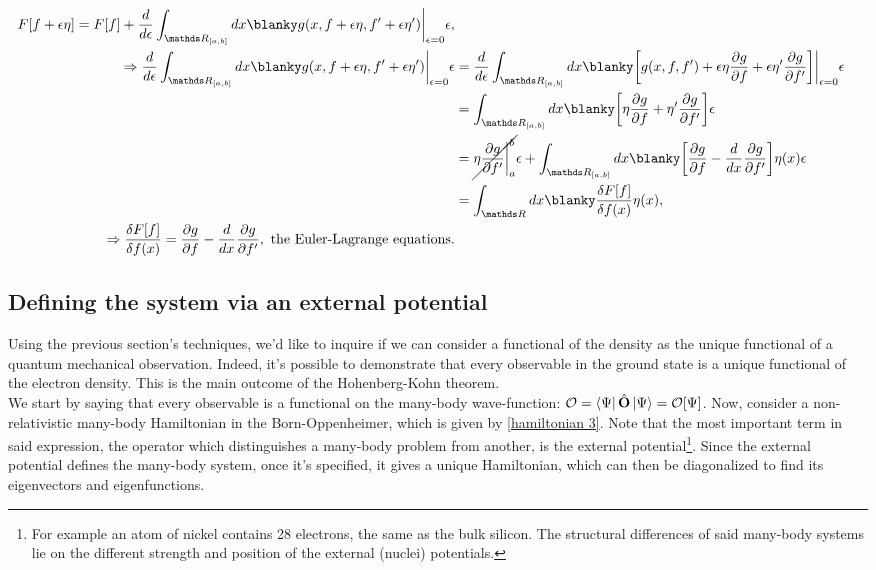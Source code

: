 \documentclass{homework}
\begin{document}
\begin{align*}
    F[f+\epsilon \eta] = F[f] + \frac{d}{d\epsilon} \int_{\R_{[a,b]}} dx \blanky g(x, f+\epsilon \eta, f'+\epsilon \eta')\bigg|_{\epsilon = 0} \epsilon, \\
    \Rightarrow \frac{d}{d\epsilon} \int_{\R_{[a,b]}} dx \blanky g(x, f+\epsilon \eta, f'+\epsilon \eta')\bigg|_{\epsilon = 0} \epsilon &= \frac{d}{d\epsilon} \int_{\R_{[a,b]}} dx \blanky\bigg[ g(x,f,f') + \epsilon \eta \frac{\partial g}{\partial f}  + \epsilon \eta' \frac{\partial g}{\partial f'} \bigg]\bigg|_{\epsilon = 0} \epsilon \\
    &= \int_{\R_{[a,b]}} dx \blanky\bigg[\eta \frac{\partial g}{\partial f}  + \eta' \frac{\partial g}{\partial f'} \bigg] \epsilon \\
    &= \cancel{\eta \frac{\partial g}{\partial f'}\bigg|_{a}^{b}} \epsilon + \int_{\R_{[a,b]}} dx \blanky\bigg[ \frac{\partial g}{\partial f}  - \frac{d}{dx}\frac{\partial g}{\partial f'} \bigg] \eta (x) \epsilon \\
    &= \int_{\R} dx \blanky \frac{\delta F[f]}{\delta f(x)} \eta(x),\\
\Rightarrow \frac{\delta F[f]}{\delta f(x)} = \frac{\partial g}{\partial f}  - \frac{d}{dx}\frac{\partial g}{\partial f'}, \textnormal{ the Euler-Lagrange equations.} 
 \end{align*}
 
\clearpage

\subsection{Defining the system via an external potential}

Using the previous section's techniques, we'd like to inquire if we can consider a functional of the density as the unique functional of a quantum mechanical observation. Indeed, it's possible to demonstrate that every observable in the ground state is a unique functional of the electron density. This is the main outcome of the Hohenberg-Kohn theorem. \\

We start by saying that every observable is a functional on the many-body wave-function: $\mathcal{O} = \bra{\Psi}\hat{\bf O}\ket{\Psi} = \mathcal{O}[\Psi]$. Now, consider a non-relativistic many-body Hamiltonian in the Born-Oppenheimer, which is given by \eqref{hamiltonian 3}. Note that the most important term in said expression, the operator which distinguishes a many-body problem from another, is the external potential\footnote{For example an atom of nickel contains 28 electrons, the same as the bulk silicon. The structural differences of said many-body systems lie on the different strength and position of the external (nuclei) potentials.}. Since the external potential defines the many-body system, once it's specified, it gives a unique Hamiltonian, which can then be diagonalized to find its eigenvectors and eigenfunctions. \\
\end{document}
